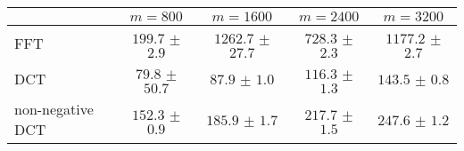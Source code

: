 \centering
\renewcommand{\arraystretch}{1.2}
\begin{tabular}{@{}lcccc@{}}
\toprule
 & $m=800$ & $m=1600$ & $m=2400$ & $m=3200$\\
\midrule
FFT & $199.7$ $\pm$ $2.9$ & $1262.7$ $\pm$ $27.7$ & $728.3$ $\pm$ $2.3$ & $1177.2$ $\pm$ $2.7$ \\
DCT & $79.8$ $\pm$ $50.7$ & $87.9$ $\pm$ $1.0$ & $116.3$ $\pm$ $1.3$ & $143.5$ $\pm$ $0.8$ \\
non-negative DCT & $152.3$ $\pm$ $0.9$ & $185.9$ $\pm$ $1.7$ & $217.7$ $\pm$ $1.5$ & $247.6$ $\pm$ $1.2$ \\
\bottomrule
\end{tabular}
